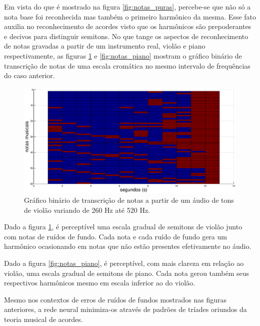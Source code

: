 Em vista do que é mostrado na figura \ref{fig:notas_puras}, percebe-se que não só a nota base foi reconhecida mas também o primeiro harmônico da mesma. Esse fato auxilia no reconhecimento de acordes visto que os harmônicos são prepoderantes e decivos para distinguir semitons. No que tange os aspectos de reconhecimento de notas gravadas a partir de um instrumento real, violão e piano respectivamente, as figuras \ref{fig:notas_violao} e \ref{fig:notas_piano} mostram o gráfico binário de transcrição de notas de uma escala cromática no mesmo intervalo de frequências do caso anterior.

\begin{figure}[h]
    \centering
    \includegraphics[keepaspectratio=true,scale=0.5]{figuras/notas_violao.eps}
  \caption{Gráfico binário de transcrição de notas a partir de um áudio de tons de violão variando de 260 Hz até 520 Hz.}
  \label{fig:notas_violao}
\end{figure}       

Dado a figura \ref{fig:notas_violao}, é perceptível uma escala gradual de semitons de violão junto com notas de ruídos de fundo. Cada nota e cada ruído de fundo gera um harmônico ocasionando em notas que não estão presentes efetivamente no áudio.

Dado a figura \ref{fig:notas_piano}, é perceptível, com mais clareza em relação ao violão, uma escala gradual de semitons de piano. Cada nota gerou também seus respectivos harmônicos mesmo em escala inferior ao do violão.

Mesmo nos contextos de erros de ruídos de fundos mostrados nas figuras anteriores, a rede neural minimiza-os através de padrões de tríades oriundos da teoria musical de acordes.

